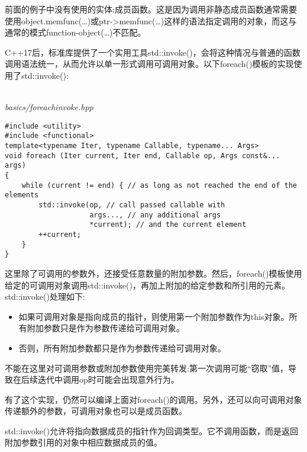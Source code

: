 
前面的例子中没有使用的实体:成员函数。这是因为调用非静态成员函数通常需要使用object.memfunc(…)或ptr->memfunc(…)这样的语法指定调用的对象，而这与通常的模式function-object(…)不匹配。

C++17后，标准库提供了一个实用工具std::invoke()，会将这种情况与普通的函数调用语法统一，从而允许以单一形式调用可调用对象。以下foreach()模板的实现使用了std::invoke():

\hspace*{\fill} \\ %
\noindent
\textit{basics/foreachinvoke.hpp}
\begin{lstlisting}[style=styleCXX]
#include <utility>
#include <functional>
template<typename Iter, typename Callable, typename... Args>
void foreach (Iter current, Iter end, Callable op, Args const&... args)
{
	while (current != end) { // as long as not reached the end of the elements
		std::invoke(op, // call passed callable with
					args..., // any additional args
					*current); // and the current element
		++current;
	}
}
\end{lstlisting}

这里除了可调用的参数外，还接受任意数量的附加参数。然后，foreach()模板使用给定的可调用对象调用std::invoke()，再加上附加的给定参数和所引用的元素。std::invoke()处理如下:

\begin{itemize}
\item
如果可调用对象是指向成员的指针，则使用第一个附加参数作为this对象。所有附加参数只是作为参数传递给可调用对象。

\item
否则，所有附加参数都只是作为参数传递给可调用对象。
\end{itemize}

不能在这里对可调用参数或附加参数使用完美转发:第一次调用可能“窃取”值，导致在后续迭代中调用op时可能会出现意外行为。

有了这个实现，仍然可以编译上面对foreach()的调用。另外，还可以向可调用对象传递额外的参数，可调用对象也可以是成员函数。

\begin{tcolorbox}[colback=webgreen!5!white,colframe=webgreen!75!black]
\hspace*{0.75cm}std::invoke()允许将指向数据成员的指针作为回调类型。它不调用函数，而是返回附加参数引用的对象中相应数据成员的值。
\end{tcolorbox}

